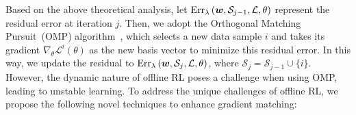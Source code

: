 
Based on the above theoretical analysis, let $\operatorname{Err}_{\lambda}\left({\bm{w}}, \mathcal{S}_{j-1}, \mathcal L, \theta\right)$ represent the residual error at iteration $j$.
Then, we adopt the Orthogonal Matching Pursuit~(OMP) algorithm~\citep{elenberg2018restricted}, which selects a new data sample $i$ and takes its gradient $\nabla_{\theta}\mathcal L^i\left(\theta\right)$ as the new basis vector to minimize this residual error.
In this way, we update the residual to $\operatorname{Err}_{\lambda}\left({\bm{w}}, \mathcal{S}_{j}, \mathcal L, \theta\right)$, where $\mathcal{S}_j = \mathcal{S}_{j-1} \cup \{i\}$.
However, the dynamic nature of offline RL poses a challenge when using OMP, leading to unstable learning.
To address the unique challenges of offline RL, we propose the following novel techniques to enhance gradient matching:




